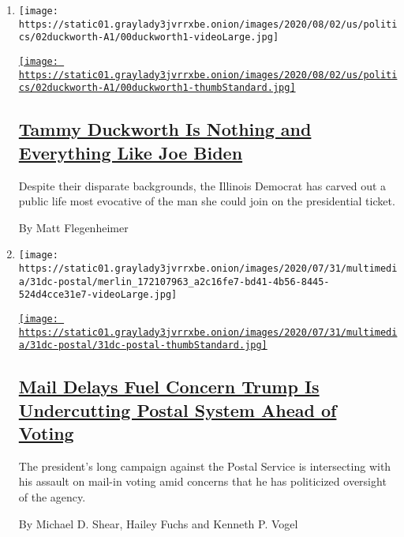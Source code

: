 \begin{enumerate}
\def\labelenumi{\arabic{enumi}.}
\item
  \texttt{[image: https://static01.graylady3jvrrxbe.onion/images/2020/08/02/us/politics/02duckworth-A1/00duckworth1-videoLarge.jpg]}

  \href{/2020/08/01/us/politics/tammy-duckworth-biden-vp.html}{\texttt{[image: https://static01.graylady3jvrrxbe.onion/images/2020/08/02/us/politics/02duckworth-A1/00duckworth1-thumbStandard.jpg]}}

  \hypertarget{tammy-duckworth-is-nothing-and-everything-like-joe-biden}{%
  \subsection{\texorpdfstring{\href{/2020/08/01/us/politics/tammy-duckworth-biden-vp.html}{Tammy
  Duckworth Is Nothing and Everything Like Joe
  Biden}}{Tammy Duckworth Is Nothing and Everything Like Joe Biden}}\label{tammy-duckworth-is-nothing-and-everything-like-joe-biden}}

  Despite their disparate backgrounds, the Illinois Democrat has carved
  out a public life most evocative of the man she could join on the
  presidential ticket.

  By Matt Flegenheimer
\item
  \texttt{[image: https://static01.graylady3jvrrxbe.onion/images/2020/07/31/multimedia/31dc-postal/merlin\_172107963\_a2c16fe7-bd41-4b56-8445-524d4cce31e7-videoLarge.jpg]}

  \href{/2020/07/31/us/politics/trump-usps-mail-delays.html}{\texttt{[image: https://static01.graylady3jvrrxbe.onion/images/2020/07/31/multimedia/31dc-postal/31dc-postal-thumbStandard.jpg]}}

  \hypertarget{mail-delays-fuel-concern-trump-is-undercutting-postal-system-ahead-of-voting}{%
  \subsection{\texorpdfstring{\href{/2020/07/31/us/politics/trump-usps-mail-delays.html}{Mail
  Delays Fuel Concern Trump Is Undercutting Postal System Ahead of
  Voting}}{Mail Delays Fuel Concern Trump Is Undercutting Postal System Ahead of Voting}}\label{mail-delays-fuel-concern-trump-is-undercutting-postal-system-ahead-of-voting}}

  The president's long campaign against the Postal Service is
  intersecting with his assault on mail-in voting amid concerns that he
  has politicized oversight of the agency.

  By Michael D. Shear, Hailey Fuchs and Kenneth P. Vogel
\end{enumerate}

